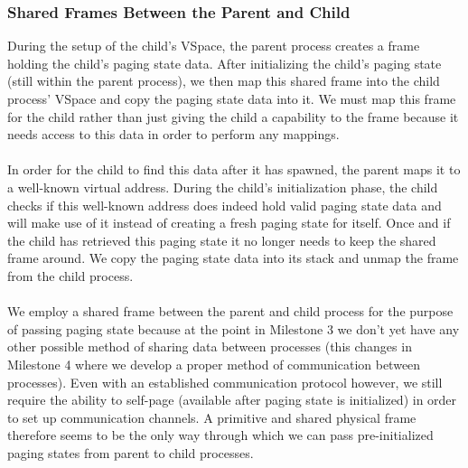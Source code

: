 \subsubsection{Shared Frames Between the Parent and Child}
During the setup of the child's VSpace, the parent process creates a frame holding the child's paging state data. After initializing the child's paging state (still within the parent process), we then map this shared frame into the child process' VSpace and copy the paging state data into it. We must map this frame for the child rather than just giving the child a capability to the frame because it needs access to this data in order to perform any mappings. 
\\\\
In order for the child to find this data after it has spawned, the parent maps it to a well-known virtual address. During the child's initialization phase, the child checks if this well-known address does indeed hold valid paging state data and will make use of it instead of creating a fresh paging state for itself. Once and if the child has retrieved this paging state it no longer needs to keep the shared frame around. We copy the paging state data into its stack and unmap the frame from the child process.
\\\\
We employ a shared frame between the parent and child process for the purpose of passing paging state because at the point in Milestone 3 we don't yet have any other possible method of sharing data between processes (this changes in Milestone 4 where we develop a proper method of communication between processes). Even with an established communication protocol however, we still require the ability to self-page (available after paging state is initialized) in order to set up communication channels. A primitive and shared physical frame therefore seems to be the only way through which we can pass pre-initialized paging states from parent to child processes. 

